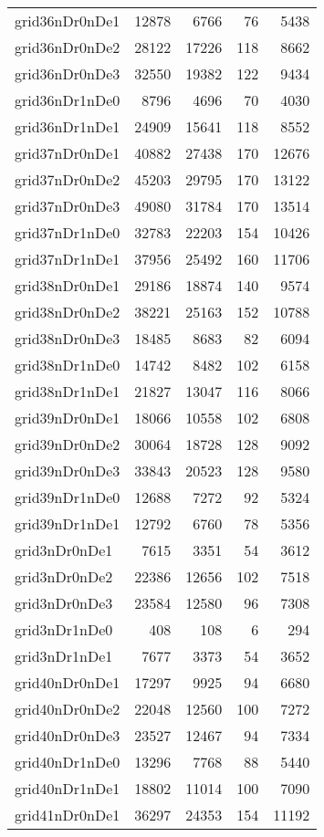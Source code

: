 \begin{longtable}{lrrrr}
grid36nDr0nDe1 & 12878 & 6766 & 76 & 5438 \\
grid36nDr0nDe2 & 28122 & 17226 & 118 & 8662 \\
grid36nDr0nDe3 & 32550 & 19382 & 122 & 9434 \\
grid36nDr1nDe0 & 8796 & 4696 & 70 & 4030 \\
grid36nDr1nDe1 & 24909 & 15641 & 118 & 8552 \\
grid37nDr0nDe1 & 40882 & 27438 & 170 & 12676 \\
grid37nDr0nDe2 & 45203 & 29795 & 170 & 13122 \\
grid37nDr0nDe3 & 49080 & 31784 & 170 & 13514 \\
grid37nDr1nDe0 & 32783 & 22203 & 154 & 10426 \\
grid37nDr1nDe1 & 37956 & 25492 & 160 & 11706 \\
grid38nDr0nDe1 & 29186 & 18874 & 140 & 9574 \\
grid38nDr0nDe2 & 38221 & 25163 & 152 & 10788 \\
grid38nDr0nDe3 & 18485 & 8683 & 82 & 6094 \\
grid38nDr1nDe0 & 14742 & 8482 & 102 & 6158 \\
grid38nDr1nDe1 & 21827 & 13047 & 116 & 8066 \\
grid39nDr0nDe1 & 18066 & 10558 & 102 & 6808 \\
grid39nDr0nDe2 & 30064 & 18728 & 128 & 9092 \\
grid39nDr0nDe3 & 33843 & 20523 & 128 & 9580 \\
grid39nDr1nDe0 & 12688 & 7272 & 92 & 5324 \\
grid39nDr1nDe1 & 12792 & 6760 & 78 & 5356 \\
grid3nDr0nDe1 & 7615 & 3351 & 54 & 3612 \\
grid3nDr0nDe2 & 22386 & 12656 & 102 & 7518 \\
grid3nDr0nDe3 & 23584 & 12580 & 96 & 7308 \\
grid3nDr1nDe0 & 408 & 108 & 6 & 294 \\
grid3nDr1nDe1 & 7677 & 3373 & 54 & 3652 \\
grid40nDr0nDe1 & 17297 & 9925 & 94 & 6680 \\
grid40nDr0nDe2 & 22048 & 12560 & 100 & 7272 \\
grid40nDr0nDe3 & 23527 & 12467 & 94 & 7334 \\
grid40nDr1nDe0 & 13296 & 7768 & 88 & 5440 \\
grid40nDr1nDe1 & 18802 & 11014 & 100 & 7090 \\
grid41nDr0nDe1 & 36297 & 24353 & 154 & 11192 \\

\end{longtable}
